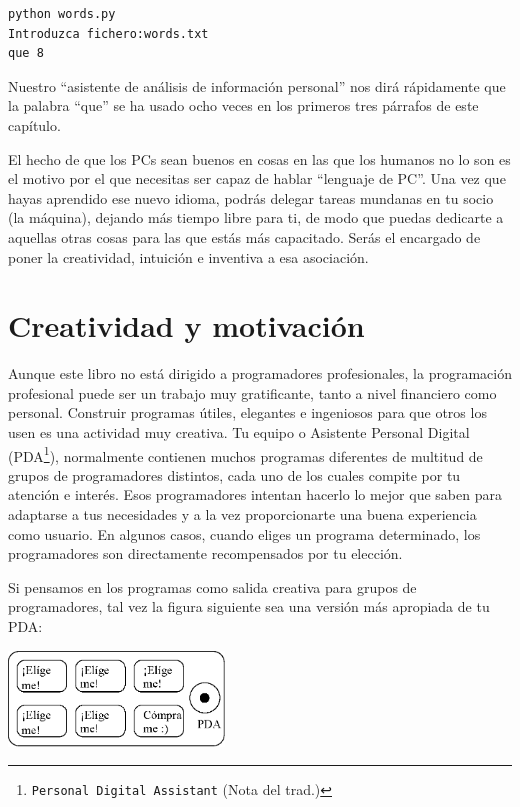 \beforeverb
\begin{verbatim}
python words.py
Introduzca fichero:words.txt
que 8
\end{verbatim}
\afterverb
%
Nuestro ``asistente de análisis de información personal'' nos dirá
rápidamente que la palabra ``que'' se ha usado ocho veces en los
primeros tres párrafos de este capítulo.

El hecho de que los PCs sean buenos en cosas
en las que los humanos no lo son es el motivo por el que necesitas
ser capaz de hablar ``lenguaje de PC''. Una vez que hayas
aprendido ese nuevo idioma, podrás delegar tareas mundanas
en tu socio (la máquina), dejando más tiempo libre
para ti, de modo que puedas dedicarte a aquellas otras cosas
para las que estás más capacitado. Serás el encargado
de poner la creatividad, intuición e inventiva a esa
asociación.

\section{Creatividad y motivación}

Aunque este libro no está dirigido a programadores profesionales, la programación
profesional puede ser un trabajo muy gratificante, tanto a nivel financiero como personal.
Construir programas útiles, elegantes e ingeniosos para que otros los usen
es una actividad muy creativa. Tu equipo o Asistente Personal Digital
(PDA\footnote{{\tt Personal Digital Assistant} (Nota del trad.)}),
normalmente contienen muchos programas diferentes de multitud de grupos de programadores
distintos, cada uno de los cuales compite por tu atención e interés.
Esos programadores intentan hacerlo lo mejor que saben para adaptarse a tus necesidades y
a la vez proporcionarte una buena experiencia como usuario. En algunos casos, cuando eliges un
programa determinado, los programadores son directamente recompensados por tu elección.

Si pensamos en los programas como salida creativa para grupos de programadores,
tal vez la figura siguiente sea una versión más apropiada de tu PDA:

\beforefig
\centerline{\includegraphics[height=1.00in]{figs2/pda2.eps}}
\afterfig

